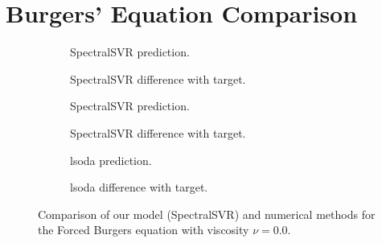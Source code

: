 \section{Burgers' Equation Comparison}\label{sec:burgers_comparison}
\begin{figure}[H]
  \centering
  \begin{adjustwidth}{-0.05\linewidth}{-0.05\linewidth}
    \begin{subfigure}{0.49\linewidth}
      \begin{adjustbox}{width=\linewidth}
        
      \end{adjustbox}
      \caption{SpectralSVR prediction.}\label{fig:comp_lssvr_pred_0.0}
    \end{subfigure}
    \begin{subfigure}{0.49\linewidth}
      \begin{adjustbox}{width=\linewidth}
        
      \end{adjustbox}
      \caption{SpectralSVR difference with target.}\label{fig:comp_lssvr_diff_0.0}
    \end{subfigure}
    \begin{subfigure}{0.49\linewidth}
      \begin{adjustbox}{width=\linewidth}
        
      \end{adjustbox}
      \caption{SpectralSVR prediction.}\label{fig:comp_fnn_pred_0.0}
    \end{subfigure}
    \begin{subfigure}{0.49\linewidth}
      \begin{adjustbox}{width=\linewidth}
        
      \end{adjustbox}
      \caption{SpectralSVR difference with target.}\label{fig:comp_fnn_diff_0.0}
    \end{subfigure}
    \begin{subfigure}{0.49\linewidth}
      \begin{adjustbox}{width=\linewidth}
        
      \end{adjustbox}
      \caption{lsoda prediction.}\label{fig:comp_spo_pred_0.0}
    \end{subfigure}
    \begin{subfigure}{0.49\linewidth}
      \begin{adjustbox}{width=\linewidth}
        
      \end{adjustbox}
      \caption{lsoda difference with target.}\label{fig:comp_spo_diff_0.0}
    \end{subfigure}
  \end{adjustwidth}
  \caption{Comparison of our model (SpectralSVR) and numerical methods for the Forced Burgers equation with viscosity \(\nu=0.0\).}\label{fig:comparison_burgers_0.0}
\end{figure}

